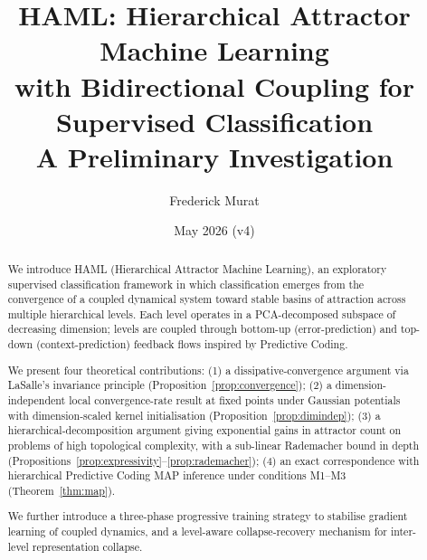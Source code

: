 \documentclass[11pt,a4paper]{article}
\title{HAML: Hierarchical Attractor Machine Learning\\
with Bidirectional Coupling for Supervised Classification\\[0.5em]
\large A Preliminary Investigation}
\author{Frederick Murat}
\affil{Independent Researcher \\ \texttt{contact via GitHub: ikobootloader}}
\date{May 2026 (v4)}
\begin{document}
\maketitle

\begin{abstract}
We introduce HAML (Hierarchical Attractor Machine Learning), an exploratory supervised
classification framework in which classification emerges from the convergence of a coupled
dynamical system toward stable basins of attraction across multiple hierarchical levels.
Each level operates in a PCA-decomposed subspace of decreasing dimension; levels are coupled
through bottom-up (error-prediction) and top-down (context-prediction) feedback flows
inspired by Predictive Coding.

We present four theoretical contributions:
(1) a dissipative-convergence argument via LaSalle's invariance principle (Proposition~\ref{prop:convergence});
(2) a dimension-independent local convergence-rate result at fixed points under Gaussian
potentials with dimension-scaled kernel initialisation (Proposition~\ref{prop:dimindep});
(3) a hierarchical-decomposition argument giving exponential gains in attractor count
on problems of high topological complexity, with a sub-linear Rademacher bound in depth
(Propositions~\ref{prop:expressivity}--\ref{prop:rademacher});
(4) an exact correspondence with hierarchical Predictive Coding MAP inference under
conditions M1--M3 (Theorem~\ref{thm:map}).

We further introduce a three-phase progressive training strategy to stabilise gradient
learning of coupled dynamics, and a level-aware collapse-recovery mechanism for inter-level
representation collapse.


\end{abstract}
\end{document}
